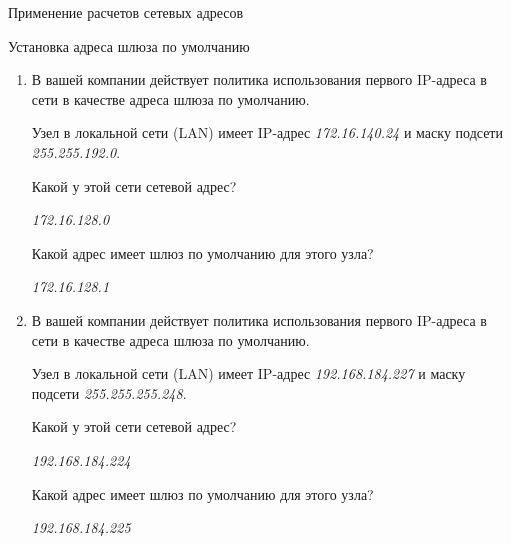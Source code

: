 \documentclass[a4paper,14pt]{extarticle}
\begin{document}
\begin{mypart}{Применение расчетов сетевых адресов}
	\begin{step}{Установка адреса шлюза по умолчанию}
		\begin{enumerate}[label=\alph{enumi}) ]
			\item 
			В вашей компании действует политика использования первого IP-адреса в сети в качестве адреса
			шлюза по умолчанию. 
			
			Узел в локальной сети (LAN) имеет IP-адрес \textit{172.16.140.24} и маску подсети
			\textit{255.255.192.0}.
			
			\q Какой у этой сети сетевой адрес?
			
			\ans \textit{172.16.128.0}
			
			\q Какой адрес имеет шлюз по умолчанию для этого узла?
			
			\ans \textit{172.16.128.1}
			
			\item 
			В вашей компании действует политика использования первого IP-адреса в сети в качестве адреса
			шлюза по умолчанию. 
			
			Узел в локальной сети (LAN) имеет IP-адрес \textit{192.168.184.227} и маску подсети
			\textit{255.255.255.248}.
			
			\q Какой у этой сети сетевой адрес?
			
			\ans \textit{192.168.184.224}
			
			\q Какой адрес имеет шлюз по умолчанию для этого узла?
			
			\ans \textit{192.168.184.225}
		\end{enumerate}
	\end{step}
\end{mypart}
\newpage
\end{document}
